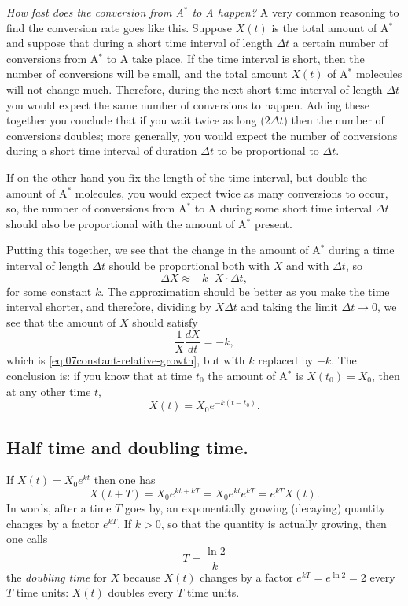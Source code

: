 {\itshape%
  How fast does the conversion from {\upshape A}$^*$ to {\upshape A}
  happen?}  A very common reasoning to find the conversion rate goes
like this.  Suppose $X(t)$ is the total amount of A$^*$ and suppose
that during a short time interval of length $\Delta t$ a certain
number of conversions from A$^*$ to A take place.  If the time
interval is short, then the number of conversions will be small, and
the total amount $X(t)$ of A$^*$ molecules will not change much.
Therefore, during the next short time interval of length $\Delta t$
you would expect the same number of conversions to happen.  Adding
these together you conclude that if you wait twice as long ($2\Delta
t$) then the number of conversions doubles; more generally, you would
expect the number of conversions during a short time interval of
duration $\Delta t$ to be proportional to $\Delta t$.




If on the other hand you fix the length of the time interval, but
double the amount of A$^*$ molecules, you would expect twice as many
conversions to occur, so, the number of conversions from A$^*$ to A
during some short time interval $\Delta t$ should also be proportional
with the amount of A$^*$ present.


Putting this together, we see that the change in the amount of A$^*$
during a time interval of length $\Delta t$ should be proportional
both with $X$ and with $\Delta t$, so
\[
\Delta X \approx - k\cdot X\cdot \Delta t,
\]
for some constant $k$.  The approximation should be better as you make
the time interval shorter, and therefore, dividing by $X\Delta t$ and
taking the limit $\Delta t\to0$, we see that the amount of $X$ should
satisfy
\[
\frac{1} {X} \frac{dX} {dt} = -k,
\]
which is \eqref{eq:07constant-relative-growth}, but with $k$ replaced
by $-k$.  The conclusion is: if you know that at time $t_0$ the
amount of A$^*$ is $X(t_0) = X_0$, then at any other time $t$,
\[
X(t) = X_0 e^{-k(t-t_0)}.
\]








\subsection{Half time and doubling time. } %
If $X(t) = X_0 e^{kt}$ then one has
\[
X(t+T) = X_0e^{kt+kT} = X_0e^{kt}e^{kT} = e^{kT}X(t).
\]
In words, after a time $T$ goes by, an exponentially growing (decaying) quantity
changes by a factor $e^{kT}$.  If $k>0$, so that the quantity is actually
growing, then one calls
\[
T = \frac{\ln 2}{k}
\]
the \emph{doubling time} for $X$ because $X(t)$ changes by a factor $e^{kT} =
e^{\ln2} = 2$ every $T$ time units:  $X(t)$ doubles every $T$ time units.




